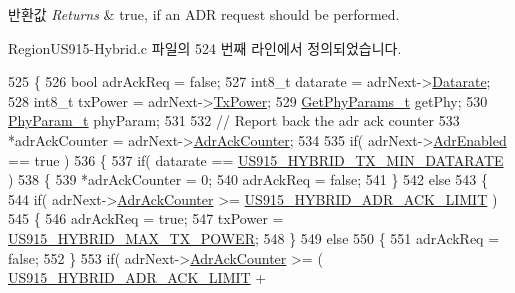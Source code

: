 \begin{DoxyRetVals}{반환값}
{\em Returns} & true, if an A\+DR request should be performed. \\
\hline
\end{DoxyRetVals}


Region\+U\+S915-\/\+Hybrid.\+c 파일의 524 번째 라인에서 정의되었습니다.


\begin{DoxyCode}
525 \{
526     \textcolor{keywordtype}{bool} adrAckReq = \textcolor{keyword}{false};
527     int8\_t datarate = adrNext->\mbox{\hyperlink{structs_adr_next_params_ae2f6080f3aa0e9485c55513ca56bb24d}{Datarate}};
528     int8\_t txPower = adrNext->\mbox{\hyperlink{structs_adr_next_params_a037b4f849fa8ed4aa1d3c58aef2b28ec}{TxPower}};
529     \mbox{\hyperlink{structs_get_phy_params}{GetPhyParams\_t}} getPhy;
530     \mbox{\hyperlink{unionu_phy_param}{PhyParam\_t}} phyParam;
531 
532     \textcolor{comment}{// Report back the adr ack counter}
533     *adrAckCounter = adrNext->\mbox{\hyperlink{structs_adr_next_params_a24f0356a3491bf07be9ac99ffa33896a}{AdrAckCounter}};
534 
535     \textcolor{keywordflow}{if}( adrNext->\mbox{\hyperlink{structs_adr_next_params_ab3e2fb44577c95786e11aacd56769703}{AdrEnabled}} == \textcolor{keyword}{true} )
536     \{
537         \textcolor{keywordflow}{if}( datarate == \mbox{\hyperlink{group___r_e_g_i_o_n_u_s915_h_y_b_ga6c7ab6789cb7bb1a5c1e22833905f787}{US915\_HYBRID\_TX\_MIN\_DATARATE}} )
538         \{
539             *adrAckCounter = 0;
540             adrAckReq = \textcolor{keyword}{false};
541         \}
542         \textcolor{keywordflow}{else}
543         \{
544             \textcolor{keywordflow}{if}( adrNext->\mbox{\hyperlink{structs_adr_next_params_a24f0356a3491bf07be9ac99ffa33896a}{AdrAckCounter}} >= 
      \mbox{\hyperlink{group___r_e_g_i_o_n_u_s915_h_y_b_ga1a479117e6e72786f00838f96288ecfd}{US915\_HYBRID\_ADR\_ACK\_LIMIT}} )
545             \{
546                 adrAckReq = \textcolor{keyword}{true};
547                 txPower = \mbox{\hyperlink{group___r_e_g_i_o_n_u_s915_h_y_b_ga94a1ed1e5cca1f05f0ac4916e164f529}{US915\_HYBRID\_MAX\_TX\_POWER}};
548             \}
549             \textcolor{keywordflow}{else}
550             \{
551                 adrAckReq = \textcolor{keyword}{false};
552             \}
553             \textcolor{keywordflow}{if}( adrNext->\mbox{\hyperlink{structs_adr_next_params_a24f0356a3491bf07be9ac99ffa33896a}{AdrAckCounter}} >= ( 
      \mbox{\hyperlink{group___r_e_g_i_o_n_u_s915_h_y_b_ga1a479117e6e72786f00838f96288ecfd}{US915\_HYBRID\_ADR\_ACK\_LIMIT}} + 

\end{DoxyCode}
